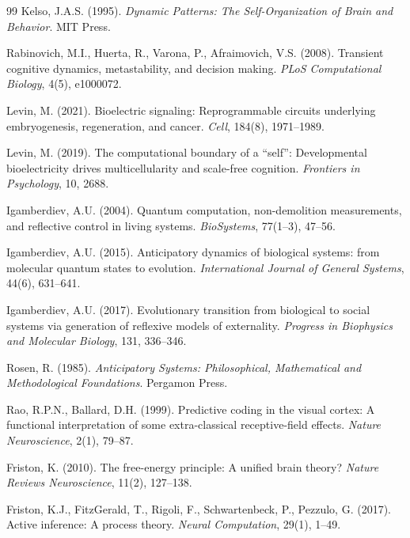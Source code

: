 \documentclass[12pt]{article}
\begin{document}
\begin{thebibliography}{99}
Kelso, J.A.S. (1995). \textit{Dynamic Patterns: The Self-Organization of Brain and Behavior}. MIT Press.

Rabinovich, M.I., Huerta, R., Varona, P., Afraimovich, V.S. (2008). Transient cognitive dynamics, metastability, and decision making. \textit{PLoS Computational Biology}, 4(5), e1000072.

Levin, M. (2021). Bioelectric signaling: Reprogrammable circuits underlying embryogenesis, regeneration, and cancer. \textit{Cell}, 184(8), 1971--1989.

Levin, M. (2019). The computational boundary of a ``self'': Developmental bioelectricity drives multicellularity and scale-free cognition. \textit{Frontiers in Psychology}, 10, 2688.


Igamberdiev, A.U. (2004). Quantum computation, non-demolition measurements, and reflective control in living systems. \textit{BioSystems}, 77(1--3), 47--56.

Igamberdiev, A.U. (2015). Anticipatory dynamics of biological systems: from molecular quantum states to evolution. \textit{International Journal of General Systems}, 44(6), 631--641.

Igamberdiev, A.U. (2017). Evolutionary transition from biological to social systems via generation of reflexive models of externality. \textit{Progress in Biophysics and Molecular Biology}, 131, 336--346.

Rosen, R. (1985). \textit{Anticipatory Systems: Philosophical, Mathematical and Methodological Foundations}. Pergamon Press.


Rao, R.P.N., Ballard, D.H. (1999). Predictive coding in the visual cortex: A functional interpretation of some extra-classical receptive-field effects. \textit{Nature Neuroscience}, 2(1), 79--87.

Friston, K. (2010). The free-energy principle: A unified brain theory? \textit{Nature Reviews Neuroscience}, 11(2), 127--138.

Friston, K.J., FitzGerald, T., Rigoli, F., Schwartenbeck, P., Pezzulo, G. (2017). Active inference: A process theory. \textit{Neural Computation}, 29(1), 1--49.


\end{thebibliography}
\end{document}
